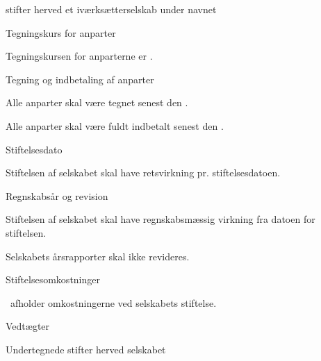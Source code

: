 \noindent stifter herved et iværksætterselskab under navnet

\begin{center}
    {\@selskabsnavn}
\end{center}

\begin{enum}
    \item Tegningskurs for anparter
    \begin{enum}    
        \item Tegningskursen for anparterne er \@tegningskurs.
    \end{enum}


    \item Tegning og indbetaling af anparter
    \begin{enum}
        \item Alle anparter skal være tegnet senest den \@stiftelsesdato.
        
        \item Alle anparter skal være fuldt indbetalt senest den \@stiftelsesdato.
    \end{enum}


    \item Stiftelsesdato
    \begin{enum}
        \item Stiftelsen af selskabet skal have retsvirkning pr. stiftelsesdatoen.
    \end{enum}


    \item Regnskabsår og revision
    \begin{enum}
        \item Stiftelsen af selskabet skal have regnskabsmæssig virkning fra datoen for stiftelsen.
        \item Selskabets årsrapporter skal ikke revideres.
    \end{enum}
    

    \item Stiftelsesomkostninger
    \begin{enum}
        \item \@stifterenstifterne\ afholder omkostningerne ved selskabets stiftelse.
    \end{enum}

    \item Vedtægter
    
\end{enum}

\noindent Undertegnede stifter herved selskabet

